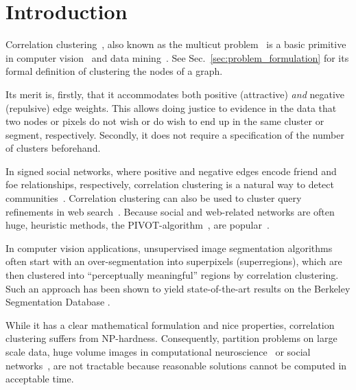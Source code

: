 %
\section{Introduction}
Correlation clustering~\cite{Bansal-2002}, also known as the multicut problem~\cite{chopra_1993_mp} 
is a basic primitive in computer vision~\cite{andres_2011_iccv,kroeger_2012_eccv,yarkony_2012_eccv,alush_2013_simbad} and data mining~\cite{Arasu-2009,Sadikov-2010,Chen-2012,Chierichetti-2014}.
See Sec.~\ref{sec:problem_formulation} for its formal definition of clustering the nodes of a graph.
 
Its merit is, firstly, that it accommodates both positive (attractive) \emph{and} negative (repulsive) edge weights.
This allows doing justice to evidence in the data that two nodes or pixels do not wish or do wish to end up in the same cluster or segment, respectively.
Secondly, it does not require a specification of the number of clusters beforehand.


In signed social networks, where positive and negative edges encode friend and foe relationships, respectively,
correlation clustering is a natural way to detect communities~\cite{Chen-2012,Chierichetti-2014}.
Correlation clustering can also be used to cluster query refinements in web search~\cite{Sadikov-2010}.
Because social and web-related networks are often huge, heuristic methods, \eg the PIVOT-algorithm~\cite{Ailon-2008},
are popular~\cite{Chierichetti-2014}.

In computer vision applications, unsupervised image segmentation algorithms often start with an over-segmentation
into superpixels (superregions), which are then clustered into ``perceptually meaningful''
regions by correlation clustering.
Such an approach has been shown to yield
state-of-the-art results on the Berkeley Segmentation Database
\cite{andres_2011_iccv,Kim-2011,yarkony_2012_eccv,alush_2013_simbad}.

While it has a clear mathematical formulation and nice properties,
correlation clustering suffers from NP-hardness. 
%
Consequently, partition problems on large scale data, \eg
huge volume images in computational neuroscience~\cite{kroeger_2012_eccv}
or social networks~\cite{Leskovec-2010}, 
are not tractable because reasonable solutions cannot be computed in acceptable time.


